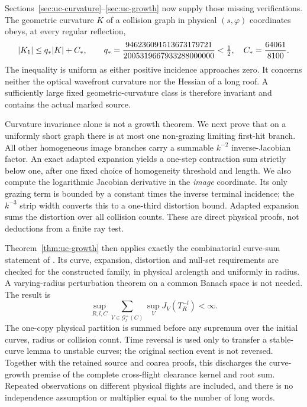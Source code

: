 \documentclass[11pt,reqno]{amsart}
\numberwithin{equation}{section}
\theoremstyle{definition}\newtheorem{definition}[theorem]{Definition}
\theoremstyle{remark}\newtheorem{remark}[theorem]{Remark}
\begin{document}
Sections~\ref{sec:uc-curvature}--\ref{sec:uc-growth} now supply those
missing verifications. The geometric curvature $K$ of a collision graph
in physical $(s,\varphi)$ coordinates obeys, at every regular reflection,
\[
 |K_1|\le q_*|K|+C_*,\qquad
 q_*={946236091513673179721\over2005319667933288000000}<\tfrac12,
 \quad C_*={64061\over8100}.
\]
The inequality is uniform as either positive incidence approaches zero.
It concerns neither the optical wavefront curvature nor the Hessian of
a long roof. A sufficiently large fixed geometric-curvature class is
therefore invariant and contains the actual marked source.

Curvature invariance alone is not a growth theorem. We next prove that
on a uniformly short graph there is at most one non-grazing limiting
first-hit branch. All other homogeneous image branches carry a summable
$k^{-2}$ inverse-Jacobian factor. An exact adapted expansion yields a
one-step contraction sum strictly below one, after one fixed choice of
homogeneity threshold and length. We also compute the logarithmic
Jacobian derivative in the \emph{image} coordinate. Its only grazing
term is bounded by a constant times the inverse terminal incidence;
the $k^{-3}$ strip width converts this to a one-third distortion bound.
Adapted expansion sums the distortion over all collision counts.
These are direct physical proofs, not deductions from a finite ray test.

Theorem~\ref{thm:uc-growth} then applies exactly the combinatorial
curve-sum statement of \cite[Lemma 3.2(b)]{DZUniform}. Its curve,
expansion, distortion and null-set requirements are checked for the
constructed family, in physical arclength and uniformly in radius.
A varying-radius perturbation theorem on a common Banach space is not
needed. The result is
\[
 \sup_{R,l,C}\sum_{V\in\mathcal G_l^+(C)}
                  \sup_V J_V(T_R^{-l})<\infty.
\]
The one-copy physical partition is summed before any supremum over the
initial curves, radius or collision count. Time reversal is used only
to transfer a stable-curve lemma to unstable curves; the original section
event is not reversed. Together with the retained source and coarea
proofs, this discharges the curve-growth premise of the complete
cross-flight clearance kernel and root sum. Repeated observations on
different physical flights are included, and there is no independence
assumption or multiplier equal to the number of long words.
\end{document}
